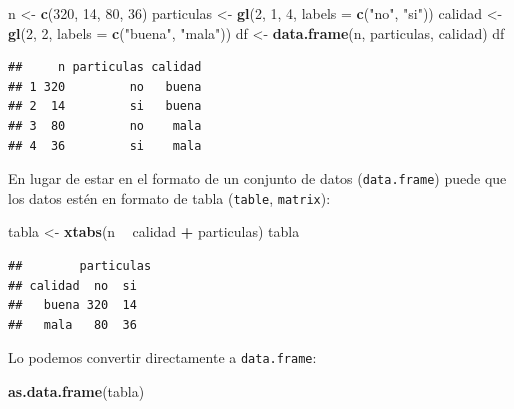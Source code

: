 \documentclass[
]{book}
\newenvironment{Shaded}{\begin{snugshade}}{\end{snugshade}}
\newcommand{\DataTypeTok}[1]{\textcolor[rgb]{0.13,0.29,0.53}{#1}}
\newcommand{\DecValTok}[1]{\textcolor[rgb]{0.00,0.00,0.81}{#1}}
\newcommand{\KeywordTok}[1]{\textcolor[rgb]{0.13,0.29,0.53}{\textbf{#1}}}
\newcommand{\NormalTok}[1]{#1}
\newcommand{\OperatorTok}[1]{\textcolor[rgb]{0.81,0.36,0.00}{\textbf{#1}}}
\newcommand{\StringTok}[1]{\textcolor[rgb]{0.31,0.60,0.02}{#1}}
\theoremstyle{break}
\theoremstyle{definition}
\theoremstyle{definition}
\theoremstyle{definition}
\theoremstyle{remark}
\begin{document}
\begin{Shaded}
\begin{Highlighting}[]
\NormalTok{n <-}\StringTok{ }\KeywordTok{c}\NormalTok{(}\DecValTok{320}\NormalTok{, }\DecValTok{14}\NormalTok{, }\DecValTok{80}\NormalTok{, }\DecValTok{36}\NormalTok{)}
\NormalTok{particulas <-}\StringTok{ }\KeywordTok{gl}\NormalTok{(}\DecValTok{2}\NormalTok{, }\DecValTok{1}\NormalTok{, }\DecValTok{4}\NormalTok{, }\DataTypeTok{labels =} \KeywordTok{c}\NormalTok{(}\StringTok{"no"}\NormalTok{, }\StringTok{"si"}\NormalTok{))}
\NormalTok{calidad <-}\StringTok{ }\KeywordTok{gl}\NormalTok{(}\DecValTok{2}\NormalTok{, }\DecValTok{2}\NormalTok{, }\DataTypeTok{labels =} \KeywordTok{c}\NormalTok{(}\StringTok{"buena"}\NormalTok{, }\StringTok{"mala"}\NormalTok{))}
\NormalTok{df <-}\StringTok{ }\KeywordTok{data.frame}\NormalTok{(n, particulas, calidad)}
\NormalTok{df}
\end{Highlighting}
\end{Shaded}

\begin{verbatim}
##     n particulas calidad
## 1 320         no   buena
## 2  14         si   buena
## 3  80         no    mala
## 4  36         si    mala
\end{verbatim}

En lugar de estar en el formato de un conjunto de datos (\texttt{data.frame})
puede que los datos estén en formato de tabla (\texttt{table}, \texttt{matrix}):

\begin{Shaded}
\begin{Highlighting}[]
\NormalTok{tabla <-}\StringTok{ }\KeywordTok{xtabs}\NormalTok{(n }\OperatorTok{~}\StringTok{ }\NormalTok{calidad }\OperatorTok{+}\StringTok{ }\NormalTok{particulas)}
\NormalTok{tabla}
\end{Highlighting}
\end{Shaded}

\begin{verbatim}
##        particulas
## calidad  no  si
##   buena 320  14
##   mala   80  36
\end{verbatim}

Lo podemos convertir directamente a \texttt{data.frame}:

\begin{Shaded}
\begin{Highlighting}[]
\KeywordTok{as.data.frame}\NormalTok{(tabla)}
\end{Highlighting}
\end{Shaded}
\end{document}
